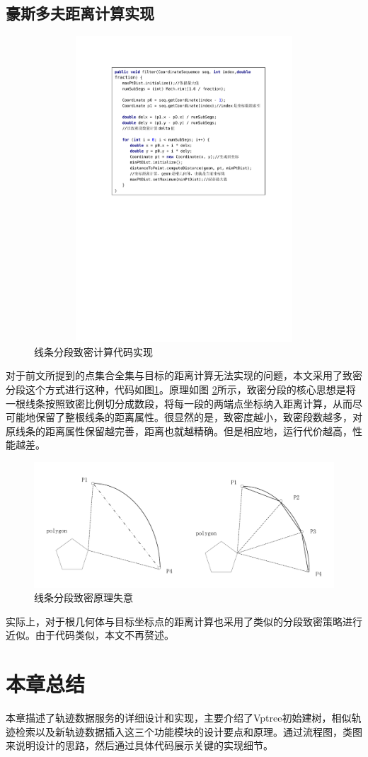 \subsection{豪斯多夫距离计算实现}
\begin{figure}[H]
  \centering
  \includegraphics[width=6in,height=4.5in]{new_FIGs/chapter4/hausdoff-code-fraction.pdf}
  \caption{线条分段致密计算代码实现}\label{hausdoff-code-fraction}
\end{figure}
对于前文所提到的点集合全集与目标的距离计算无法实现的问题，本文采用了致密分段这个方式进行这种，代码如图\ref{hausdoff-code-fraction}。原理如图
\ref{hausdoff-fraction-show}所示，致密分段的核心思想是将一根线条按照致密比例切分成数段，将每一段的两端点坐标纳入距离计算，从而尽可能地保留了整根线条的距离属性。很显然的是，致密度越小，致密段数越多，对原线条的距离属性保留越完善，距离也就越精确。但是相应地，运行代价越高，性能越差。
\begin{figure}[H]
  \centering
  \includegraphics[width=6in]{new_FIGs/chapter4/hausdoff-fraction-show.pdf}
  \caption{线条分段致密原理失意}\label{hausdoff-fraction-show}
\end{figure}
实际上，对于根几何体与目标坐标点的距离计算也采用了类似的分段致密策略进行近似。由于代码类似，本文不再赘述。

\section{本章总结}
本章描述了轨迹数据服务的详细设计和实现，主要介绍了Vptree初始建树，相似轨迹检索以及新轨迹数据插入这三个功能模块的设计要点和原理。通过流程图，类图来说明设计的思路，然后通过具体代码展示关键的实现细节。
